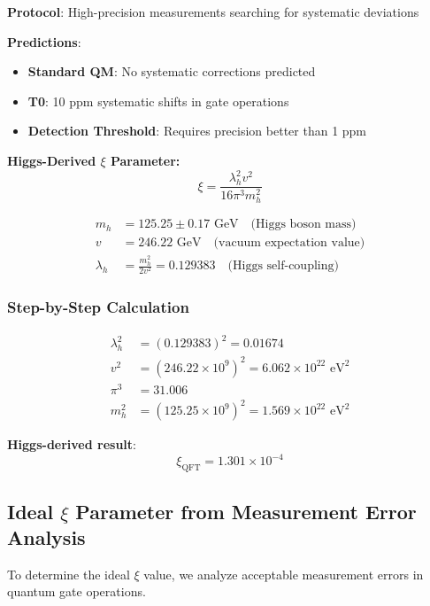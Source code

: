 	\textbf{Protocol}: High-precision measurements searching for systematic deviations
	
	\textbf{Predictions}:
	\begin{itemize}
		\item \textbf{Standard QM}: No systematic corrections predicted
		\item \textbf{T0}: 10 ppm systematic shifts in gate operations
		\item \textbf{Detection Threshold}: Requires precision better than 1 ppm
	\end{itemize}
	
	\textbf{Higgs-Derived $\xi$ Parameter:}
	\begin{equation}
		\xi = \frac{\lambda_h^2 v^2}{16\pi^3 m_h^2}
		\label{eq:higgs_xi_appendix}
	\end{equation}
	
	\begin{align}
		m_h &= 125.25 \pm 0.17 \text{ GeV} \quad \text{(Higgs boson mass)} \\
		v &= 246.22 \text{ GeV} \quad \text{(vacuum expectation value)} \\
		\lambda_h &= \frac{m_h^2}{2v^2} = 0.129383 \quad \text{(Higgs self-coupling)}
	\end{align}
	
	\subsubsection{Step-by-Step Calculation}
	
	\begin{align}
		\lambda_h^2 &= (0.129383)^2 = 0.01674 \\
		v^2 &= (246.22 \times 10^9)^2 = 6.062 \times 10^{22} \text{ eV}^2 \\
		\pi^3 &= 31.006 \\
		m_h^2 &= (125.25 \times 10^9)^2 = 1.569 \times 10^{22} \text{ eV}^2
	\end{align}
	
	\textbf{Higgs-derived result}:
	\begin{equation}
		\xi_{\text{QFT}} = 1.301 \times 10^{-4}
	\end{equation}
	
	\subsection{Ideal $\xi$ Parameter from Measurement Error Analysis}
	
	To determine the ideal $\xi$ value, we analyze acceptable measurement errors in quantum gate operations.
	
